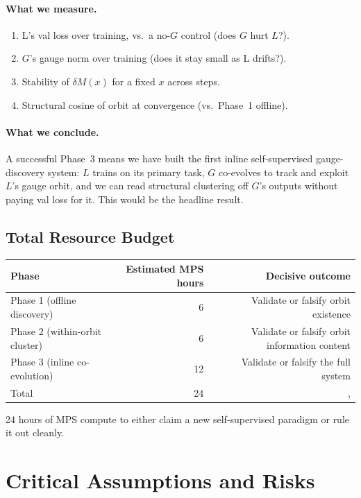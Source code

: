 \documentclass[11pt, a4paper]{article}
\theoremstyle{plain}
\theoremstyle{definition}
\theoremstyle{remark}
\begin{document}
\paragraph{What we measure.}
\begin{enumerate}[nosep]
\item L's val loss over training, vs.\ a no-$G$ control (does $G$ hurt $L$?).
\item $G$'s gauge norm over training (does it stay small as L drifts?).
\item Stability of $\delta M(x)$ for a fixed $x$ across steps.
\item Structural cosine of orbit at convergence (vs.\ Phase~1 offline).
\end{enumerate}

\paragraph{What we conclude.}
A successful Phase~3 means we have built the first inline self-supervised gauge-discovery system: $L$ trains on its primary task, $G$ co-evolves to track and exploit $L$'s gauge orbit, and we can read structural clustering off $G$'s outputs without paying val loss for it.
This would be the headline result.

\subsection{Total Resource Budget}

\begin{center}
\begin{tabular}{l r r}
\toprule
Phase & Estimated MPS hours & Decisive outcome \\
\midrule
Phase 1 (offline discovery) & 6 & Validate or falsify orbit existence \\
Phase 2 (within-orbit cluster) & 6 & Validate or falsify orbit information content \\
Phase 3 (inline co-evolution) & 12 & Validate or falsify the full system \\
\midrule
Total & 24 & ,  \\
\bottomrule
\end{tabular}
\end{center}

24 hours of MPS compute to either claim a new self-supervised paradigm or rule it out cleanly.


\section{Critical Assumptions and Risks}
\label{sec:risks-part2}
\end{document}

